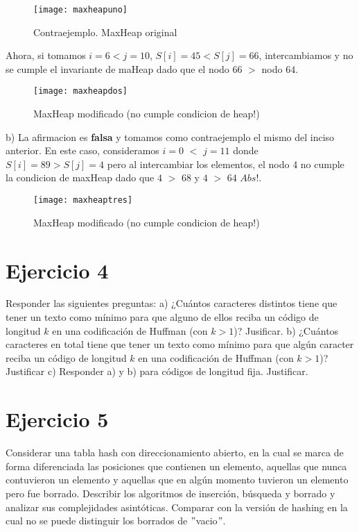 \documentclass[10pt,a4paper]{article}
\begin{document}
\begin{figure}[h]
	\centering
	\texttt{[image: maxheapuno]}
	\caption{Contraejemplo. MaxHeap original}
	\label{drivers1}
\end{figure}

Ahora, si tomamos $i = 6 < j = 10$, $S[i] = 45 < S[j] = 66$, intercambiamos y no se cumple el invariante de maHeap dado que el nodo 66 $>$ nodo $64$.

\begin{figure}[h]
	\centering
	\texttt{[image: maxheapdos]}
	\caption{MaxHeap modificado (no cumple condicion de heap!)}
	\label{drivers1}
\end{figure}
\newpage

b) La afirmacion es \textbf{falsa} y tomamos como contraejemplo el mismo del inciso anterior. 
\newline
\newline
En este caso, consideramos $i = 0$ $<$ $j=11$ donde $S[i] = 89 > S[j] = 4$ pero al intercambiar los elementos, el nodo 4 no cumple la condicion de maxHeap dado que $4$ $>$ $68$ y $4$ $>$ $64$ $Abs!$.

\begin{figure}[h]
	\centering
	\texttt{[image: maxheaptres]}
	\caption{MaxHeap modificado (no cumple condicion de heap!)}
	\label{drivers1}
\end{figure}
\newpage

\section{Ejercicio 4}

Responder las siguientes preguntas:
\newline
\newline
a) ¿Cuántos caracteres distintos tiene que tener un texto como mínimo para que alguno de ellos reciba un código de longitud $k$ en una codificación de Huffman (con $k > 1$)? Jusificar.
\newline
\newline
b) ¿Cuántos caracteres en total tiene que tener un texto como mínimo para que algún caracter reciba un código de longitud $k$ en una codificación de Huffman (con $k > 1$)? Justificar
\newline
\newline
c) Responder a) y b) para códigos de longitud fija. Justificar.
\newpage

\section{Ejercicio 5}

Considerar una tabla hash con direccionamiento abierto, en la cual se marca de forma diferenciada las posiciones que contienen un elemento, aquellas que nunca contuvieron un elemento y aquellas que en algún momento tuvieron un elemento pero fue borrado. Describir los algoritmos de inserción, búsqueda y borrado y analizar sus complejidades asintóticas. Comparar con la versión de hashing en la cual no se puede distinguir los borrados de $"$vacio$"$.
\newline
\newline
\end{document}

